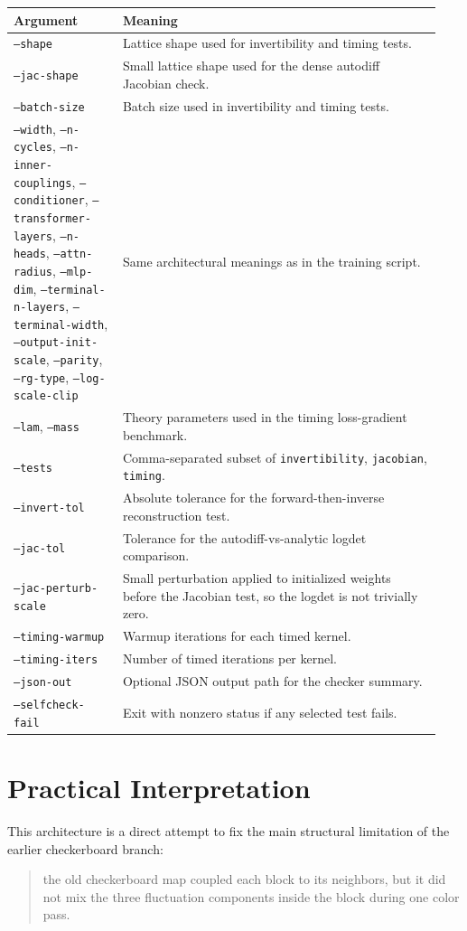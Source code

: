 \documentclass[11pt]{article}
\begin{document}
\begin{longtable}{p{0.24\linewidth}p{0.70\linewidth}}
\toprule
Argument & Meaning \\
\midrule
\endhead
\texttt{--shape} & Lattice shape used for invertibility and timing tests. \\
\texttt{--jac-shape} & Small lattice shape used for the dense autodiff Jacobian check. \\
\texttt{--batch-size} & Batch size used in invertibility and timing tests. \\
\texttt{--width}, \texttt{--n-cycles}, \texttt{--n-inner-couplings}, \texttt{--conditioner}, \texttt{--transformer-layers}, \texttt{--n-heads}, \texttt{--attn-radius}, \texttt{--mlp-dim}, \texttt{--terminal-n-layers}, \texttt{--terminal-width}, \texttt{--output-init-scale}, \texttt{--parity}, \texttt{--rg-type}, \texttt{--log-scale-clip} & Same architectural meanings as in the training script. \\
\texttt{--lam}, \texttt{--mass} & Theory parameters used in the timing loss-gradient benchmark. \\
\texttt{--tests} & Comma-separated subset of \texttt{invertibility}, \texttt{jacobian}, \texttt{timing}. \\
\texttt{--invert-tol} & Absolute tolerance for the forward-then-inverse reconstruction test. \\
\texttt{--jac-tol} & Tolerance for the autodiff-vs-analytic logdet comparison. \\
\texttt{--jac-perturb-scale} & Small perturbation applied to initialized weights before the Jacobian test, so the logdet is not trivially zero. \\
\texttt{--timing-warmup} & Warmup iterations for each timed kernel. \\
\texttt{--timing-iters} & Number of timed iterations per kernel. \\
\texttt{--json-out} & Optional JSON output path for the checker summary. \\
\texttt{--selfcheck-fail} & Exit with nonzero status if any selected test fails. \\
\bottomrule
\end{longtable}

\section{Practical Interpretation}

This architecture is a direct attempt to fix the main structural limitation of
the earlier checkerboard branch:
\begin{quote}
the old checkerboard map coupled each block to its neighbors, but it did not
mix the three fluctuation components inside the block during one color pass.
\end{quote}
\end{document}

